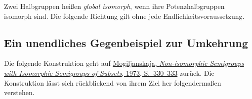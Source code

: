 \documentclass[main.tex]{subfiles}
\begin{document}
Zwei Halbgruppen heißen \emph{global isomorph}, wenn ihre
Potenzhalbgruppen isomorph sind.  Die folgende Richtung gilt ohne jede
Endlichkeitsvoraussetzung.

\begin{tabproofwide}
\end{tabproofwide}

\newcommand{\MogStar}{\mathbin{\ast}}
\newcommand{\MogDiamond}{\mathbin{\diamond}}

\subsection{Ein unendliches Gegenbeispiel zur Umkehrung}


Die folgende Konstruktion geht auf
\href{https://doi.org/10.1007/BF02389140}%
  {Mogiljanskaja, \emph{Non-isomorphic Semigroups with Isomorphic
  Semigroups of Subsets}, 1973, S.~330--333}
zurück. Die Konstruktion lässt sich rückblickend von ihrem Ziel her
folgendermaßen verstehen.
\end{document}
